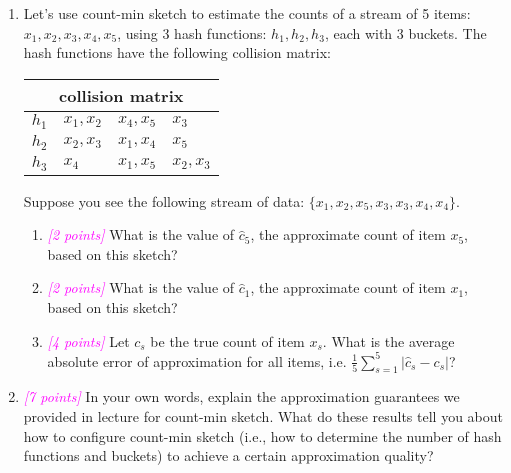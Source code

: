 \documentclass{exam}
\newcommand{\grade}[1]{\small\textcolor{magenta}{\emph{[#1 points]}} \normalsize}
\newcommand{\sol}[1]{\ifshowsolutions{\leavevmode{\color{blue}Solution: #1}}\fi}
\newif\ifshowsolutions
\begin{document}
\begin{enumerate}[label=(\alph*)]

\item Let's use count-min sketch to estimate the counts of a stream of 5 items: $x_1, x_2, x_3, x_4, x_5$, using 3 hash functions: $h_1, h_2, h_3$, each with 3 buckets. The hash functions have the following collision matrix: 

\begin{center}
\begin{tabular}{ |p{3cm}||p{3cm}|p{3cm}|p{3cm}|  }
 \hline
 \multicolumn{4}{|c|}{collision matrix} \\
 \hline
 $h_1$   & $x_1, x_2$    &$x_4, x_5$ &   $x_3$ \\
 \hline
 $h_2$&   $x_2, x_3$  & $x_1, x_4$   & $x_5$ \\
 \hline
$h_3$ & $x_4$ & $x_1, x_5$ &  $x_2, x_3$ \\
 \hline
\end{tabular}
\end{center} \hspace{0pt}

Suppose you see the following stream of data: $\{x_1, x_2, x_5, x_3, x_3, x_4, x_4\}$.

\begin{enumerate}[label=\roman*.]
    \item \grade{2} What is the value of $\hat{c}_5$, the approximate count of item $x_5$, based on this sketch? 
    
    \sol{$\hat{c}_5 = 1$}
    \vspace{2em} 
    \item \grade{2} What is the value of $\hat{c}_1$, the approximate count of item $x_1$, based on this sketch?
    
    \sol{$\hat{c}_1 = 2$} 
    \vspace{2em} 
    \item \grade{4} Let $c_s$ be the true count of item $x_s$. What is the average absolute error of approximation for all items, i.e. $\frac{1}{5}\sum_{s=1}^5|\hat{c}_s-c_s|$?
    
    \sol{The average absolute error is $\frac{2}{5}$, since $\{\hat{c}_s,c_s\}_{s=1}^5 = \{\{2,1\}, \{2,1\}, \{2,2\}, \{2,2\}, \{1,1\}\}$}
    \vspace{3em}
\end{enumerate}


\item \grade{7} In your own words, explain the approximation guarantees we provided in lecture for count-min sketch. What do these results tell you about how to configure count-min sketch (i.e., how to determine the number of hash functions and buckets) to achieve a certain approximation quality?


\end{enumerate}
\end{document}
